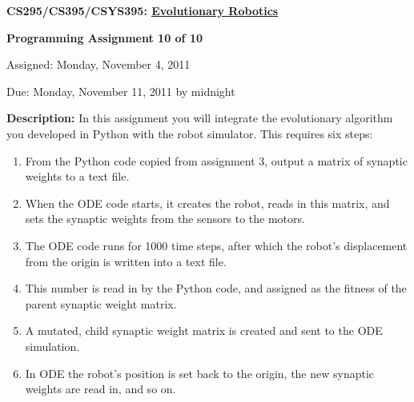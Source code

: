 \documentclass[12pt]{article}
\begin{document}
\centerline{\bf \Large CS295/CS395/CSYS395: \href{CS295_395_Syllabus.pdf}{\underline{Evolutionary Robotics}}}

\vspace{0.5cm}

\centerline{\bf \large Programming Assignment 10 of 10}

\vspace{0.5cm}

\centerline{\large Assigned: Monday, November 4, 2011}

\vspace{0.5cm}

\centerline{\large Due: Monday, November 11, 2011 by midnight}

\vspace{0.5cm}

\noindent \textbf{Description:} In this assignment you will integrate the evolutionary algorithm you developed in Python with the robot simulator. This requires six steps:

\begin{enumerate}
\item From the Python code copied from assignment 3, output a matrix of synaptic weights to a text file.
\item When the ODE code starts, it creates the robot, reads in this matrix, and sets the synaptic weights from the sensors to the motors.
\item The ODE code runs for 1000 time steps, after which the robot's displacement from the origin is written into a text file.
\item This number is read in by the Python code, and assigned as the fitness of the parent synaptic weight matrix.
\item A mutated, child synaptic weight matrix is created and sent to the ODE simulation.
\item In ODE the robot's position is set back to the origin, the new synaptic weights are read in, and so on.
\end{enumerate}
\end{document}
